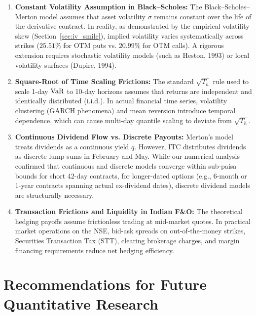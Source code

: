 \begin{enumerate}
    \item \textbf{Constant Volatility Assumption in Black--Scholes:} The Black--Scholes--Merton model assumes that asset volatility $\sigma$ remains constant over the life of the derivative contract. In reality, as demonstrated by the empirical volatility skew (Section~\ref{sec:iv_smile}), implied volatility varies systematically across strikes ($25.51\%$ for OTM puts vs. $20.99\%$ for OTM calls). A rigorous extension requires stochastic volatility models (such as Heston, 1993) or local volatility surfaces (Dupire, 1994).
    \item \textbf{Square-Root of Time Scaling Frictions:} The standard $\sqrt{T_h}$ rule used to scale 1-day $\operatorname{VaR}$ to 10-day horizons assumes that returns are independent and identically distributed ($\text{i.i.d.}$). In actual financial time series, volatility clustering (GARCH phenomena) and mean reversion introduce temporal dependence, which can cause multi-day quantile scaling to deviate from $\sqrt{T_h}$.
    \item \textbf{Continuous Dividend Flow vs. Discrete Payouts:} Merton's model treats dividends as a continuous yield $q$. However, ITC distributes dividends as discrete lump sums in February and May. While our numerical analysis confirmed that continuous and discrete models converge within sub-paisa bounds for short 42-day contracts, for longer-dated options (e.g., 6-month or 1-year contracts spanning actual ex-dividend dates), discrete dividend models are structurally necessary.
    \item \textbf{Transaction Frictions and Liquidity in Indian F\&O:} The theoretical hedging payoffs assume frictionless trading at mid-market quotes. In practical market operations on the NSE, bid-ask spreads on out-of-the-money strikes, Securities Transaction Tax (STT), clearing brokerage charges, and margin financing requirements reduce net hedging efficiency.
\end{enumerate}

\section{Recommendations for Future Quantitative Research}
\label{sec:future_research}

